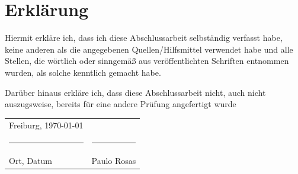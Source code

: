 \begingroup
\setlength{\parindent}{0pt}

\section*{Erklärung}

\bigskip
\bigskip
\bigskip

Hiermit erkläre ich, dass ich diese Abschlussarbeit selbständig verfasst habe, keine anderen
als die angegebenen Quellen/Hilfsmittel verwendet habe und alle Stellen, die wörtlich oder
sinngemäß aus veröffentlichten Schriften entnommen wurden, als solche kenntlich gemacht
habe.

Darüber hinaus erkläre ich, dass diese Abschlussarbeit nicht, auch nicht
auszugsweise, bereits für eine andere Prüfung angefertigt wurde

\bigskip
\bigskip
\bigskip
\bigskip
\bigskip
\bigskip

\begin{tabular}{p{} l}
    Freiburg, \today             &                              \\
    \rule{\textwidth*2/5}{0.4pt} & \rule{\textwidth*2/5}{0.4pt} \\
    Ort, Datum                   & Paulo Rosas
\end{tabular}

\endgroup
